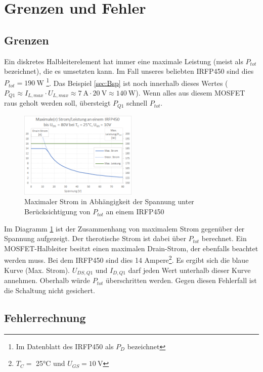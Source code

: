 \section{Grenzen und Fehler}
\label{sec:Grenzen}

\subsection{Grenzen}
Ein diskretes Halbleiterelement hat immer eine maximale Leistung (meist als $P_{tot}$ bezeichnet), die es umsetzten kann.
Im Fall unseres beliebten IRFP450 sind dies $P_{tot} = \SI{190}{\watt}$ 
\footnote{Im Datenblatt des IRFP450 \cite{IRFP450} als $P_{D}$ bezeichnet}. 
Das Beispiel \ref{sec:Bsp} ist noch innerhalb dieses Wertes 
($P_{Q1} \approx I_{L,max} \cdot U_{L,max} \approx \SI{7}{\ampere} \cdot \SI{20}{\volt} \approx \SI{140}{\watt}$). 
Wenn alles aus diesem MOSFET raus geholt werden soll, übersteigt $P_{Q1}$ schnell $P_{tot}$.

\begin{figure}[h]
	\centering
	\includegraphics[width=0.5\textwidth]{Bilder/Irfp450_Strom_Spannung.png}
	\renewcommand*\figurename{Diagramm}
	\caption{Maximaler Strom in Abhängigkeit der Spannung unter Berücksichtigung von $P_{tot}$ an einem 
		IRFP450 \cite{IRFP450}}
	\label{dia:IRFP450_S_S_L}
\end{figure}
 
Im Diagramm \ref{dia:IRFP450_S_S_L} ist der Zusammenhang von maximalem Strom gegenüber der Spannung aufgezeigt. 
Der therotische Strom ist dabei über $P_{tot}$ berechnet.
Ein MOSFET-Halbleiter besitzt einen maximalen Drain-Strom, der ebenfalls beachtet werden muss.
Bei dem IRFP450 sind dies 14 Ampere\footnote{$T_{C} = $ 25°C und $U_{GS} = \SI{10}{\volt}$}.
Es ergibt sich die blaue Kurve (Max. Strom). $U_{DS,Q1}$ und $I_{D,Q1}$ darf jeden Wert unterhalb dieser Kurve annehmen. 
Oberhalb würde 
$P_{tot}$ überschritten werden. Gegen diesen Fehlerfall ist die Schaltung nicht gesichert.

\subsection{Fehlerrechnung}

